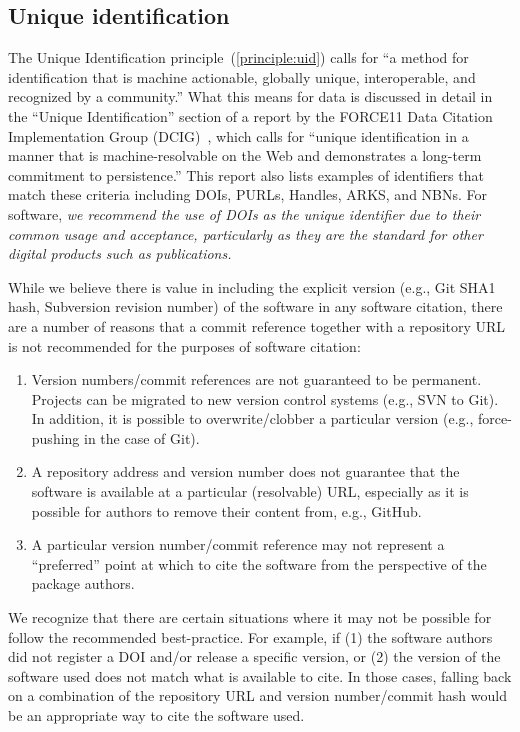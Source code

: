 \documentclass[12pt, oneside]{amsart}
\begin{document}
\subsection{Unique identification}
\label{sec:identification}

The Unique Identification principle~(\ref{principle:uid}) calls for ``a method for identification that is machine actionable, globally unique, interoperable, and recognized by a community.''
What this means for data is discussed in detail in the ``Unique Identification'' section of a report by the FORCE11 Data Citation Implementation Group (DCIG)~\cite{10.7717/peerj-cs.1}, which calls for ``unique identification in a manner that is machine-resolvable on the Web and demonstrates a long-term commitment to persistence.''
This report also lists examples of identifiers that match these criteria including DOIs, PURLs, Handles, ARKS, and NBNs.
For software, \textit{we recommend the use of DOIs as the unique identifier due to their common usage and acceptance, particularly as they are the standard for other digital products such as publications.}

While we believe there is value in including the explicit version (e.g., Git SHA1 hash, Subversion revision number) of the software in any software citation, there are a number of reasons that a commit reference together with a repository URL is not recommended for the purposes of software citation:

\begin{enumerate}
\item Version numbers/commit references are not guaranteed to be permanent. Projects can be migrated to new version control systems (e.g., SVN to Git). In addition, it is possible to overwrite/clobber a particular version (e.g., force-pushing in the case of Git).
\item A repository address and version number does not guarantee that the software is available at a particular (resolvable) URL, especially as it is possible for authors to remove their content from, e.g., GitHub.
\item A particular version number/commit reference may not represent a ``preferred'' point at which to cite the software from the perspective of the package authors.
\end{enumerate}

We recognize that there are certain situations where it may not be possible for follow the recommended best-practice.
For example, if (1) the software authors did not register a DOI and/or release a specific version, or (2) the version of the
software used does not match what is available to cite.
In those cases, falling back on a combination of the repository URL and
version number/commit hash would be an appropriate way to cite the software used.
\end{document}
